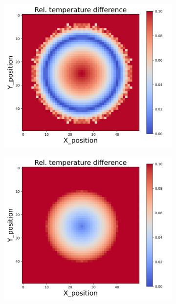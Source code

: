 \begin{figure}[h]
\begin{minipage}{\textwidth}
\begin{subfigure}{0.3\textwidth}
        \end{subfigure}
    \end{minipage}\\
    \begin{minipage}{\textwidth}
        \centering
        \begin{subfigure}{0.3\textwidth}
            \centering
            \includegraphics[width=\textwidth]{figures/raw_data/25/exp/T_bias.jpg}
        \end{subfigure}
        \begin{subfigure}{0.3\textwidth}
            \centering
            \includegraphics[width=\textwidth]{figures/raw_data/26/exp/T_bias.jpg}

\end{subfigure}
\end{minipage}
\end{figure}

